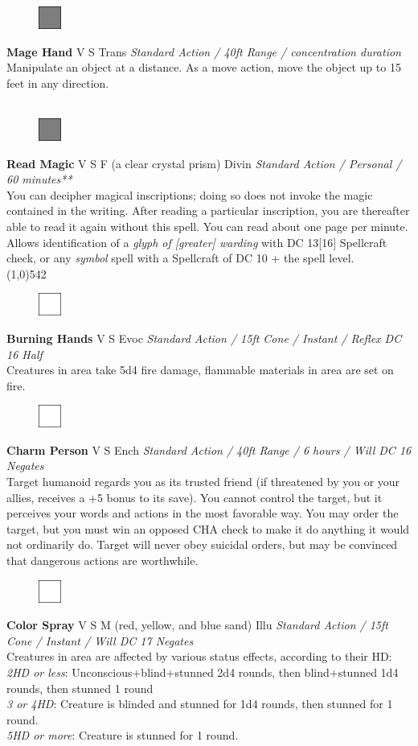 \documentclass[letterpaper]{article}
\newcommand{\fullline}{\noindent\line(1,0){542} \\}
\newcommand{\spell}[7]{
\begin{figure}
\vspace{-13pt}
\ifstrequal{#2}{Full}{  \includegraphics[width=2em]{Checkbox-Full}}{
\ifstrequal{#2}{Scroll}{\includegraphics[width=2em]{Checkbox-S}}{
                        \includegraphics[width=2em]{Checkbox}}}
\ifstrequal{#7}{}{\vspace{-1em}}{\vspace{#7}}
\end{figure}
\noindent \textbf{#1} #3 {
    \ifstrequal{#4}{Conj}{\color{Plum}Conj}{%
    \ifstrequal{#4}{Divin}{\color{YellowOrange}Divin}{%
    \ifstrequal{#4}{Ench}{\color{VioletRed}Ench}{%
    \ifstrequal{#4}{Trans}{\color{LimeGreen}Trans}{%
    \ifstrequal{#4}{Evoc}{\color{RedOrange}Evoc}{%
    \ifstrequal{#4}{Illu}{\color{ProcessBlue}Illu}{%
    \ifstrequal{#4}{Abjur}{\color{CadetBlue}Abjur}{%
    \ifstrequal{#4}{Necro}{\color{Red}Necro}{%
}}}}}}}}}
{\footnotesize \emph{#5}} \\
#6
}
\begin{document}


\spell{Mage Hand}{Full}{V S}{Trans}{Standard Action / 40ft Range / concentration duration}{%
Manipulate an object at a distance. As a move action, move the object up to 15 feet in any direction.\\}{}\\[-2em] %

\spell{Read Magic}{Full}{V S F (a clear crystal prism)}{Divin}{Standard Action / Personal / 60 minutes**}{
You can decipher magical inscriptions; doing so does not invoke the magic contained in the writing.  After reading a particular inscription, you are thereafter able to read it again without this spell.  You can read about one page per minute. Allows identification of a \emph{glyph of [greater] warding} with DC 13[16] Spellcraft check, or any \emph{symbol} spell with a Spellcraft of DC 10 + the spell level.}{1em}\\[-2em] %

\fullline
\vspace{-1.25em}

\spell{Burning Hands}{}{V S}{Evoc}{Standard Action / 15ft Cone / Instant / Reflex DC 16 Half}{%
Creatures in area take 5d4 fire damage, flammable materials in area are set on fire.}{}\\[-1em] %

\spell{Charm Person}{}{V S}{Ench}{Standard Action / 40ft Range / 6 hours / Will DC 16 \nolinebreak Negates}{%
Target humanoid regards you as its trusted friend (if threatened by you or your allies, receives a +5 bonus to its save).  You cannot control the target, but it perceives your words and actions in the most favorable way.  You may order the target, but you must win an opposed CHA check to make it do anything it would not ordinarily do.  Target will never obey suicidal orders, but may be convinced that dangerous actions are worthwhile.}{1em} %

\spell{Color Spray}{}{V S M (red, yellow, and blue sand)}{Illu}{Standard Action / 15ft Cone / Instant / Will DC 17 Negates}{%
Creatures in area are affected by various status effects, according to their HD:\\
\emph{2HD or less}: Unconscious+blind+stunned 2d4 rounds, then blind+stunned 1d4 rounds, then stunned 1 round \\
\emph{3 or 4HD}: Creature is blinded and stunned for 1d4 rounds, then stunned for 1 round.\\
\emph{5HD or more}: Creature is stunned for 1 round.}{1em}
\end{document}
